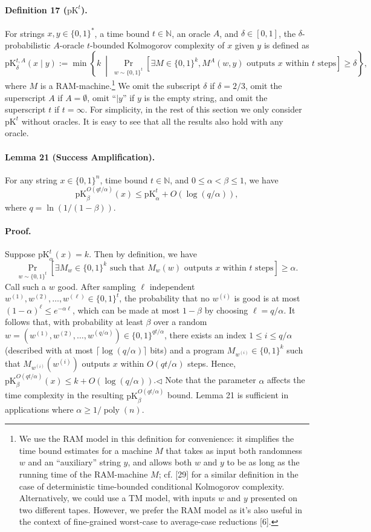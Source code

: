 \paragraph{Definition 17 ($\mathrm{pK}^t$).} For strings $x,y\in\{0,1\}^*$, a time bound $t\in\mathbb N$, an oracle $A$, and $\delta\in[0,1]$, the $\delta$-probabilistic $A$-oracle $t$-bounded Kolmogorov complexity of $x$ given $y$ is defined as
\[\mathrm{pK}_\delta^{t,A}(x\mid y):=\min\left\{k\ \middle|\ \Pr_{w\sim\{0,1\}^t}[\exists M\in\{0,1\}^k,M^A(w,y)\text{ outputs }x\text{ within }t\text{ steps}]\geq\delta\right\},\]
where $M$ is a RAM-machine.\footnote{We use the RAM model in this definition for convenience: it simplifies the time bound estimates for a machine $M$ that takes as input both randomness $w$ and an ``auxiliary'' string $y$, and allows both $w$ and $y$ to be as long as the running time of the RAM-machine $M$; cf. [29] for a similar definition in the case of deterministic time-bounded conditional Kolmogorov complexity. Alternatively, we could use a TM model, with inputs $w$ and $y$ presented on two different tapes. However, we prefer the RAM model as it's also useful in the context of fine-grained worst-case to average-case reductions [6].} We omit the subscript $\delta$ if $\delta=2/3$, omit the superscript $A$ if $A=\emptyset$, omit ``$\mid y$'' if $y$ is the empty string, and omit the superscript $t$ if $t=\infty$.
For simplicity, in the rest of this section we only consider $\mathrm{pK}^t$ without oracles. It is easy to see that all the results also hold with any oracle.
\paragraph{Lemma 21 (Success Amplification).} For any string $x\in\{0,1\}^n$, time bound $t\in\mathbb N$, and $0\leq\alpha<\beta\leq1$, we have
\[\mathrm{pK}_\beta^{O(qt/\alpha)}(x)\leq\mathrm{pK}_\alpha^t+O(\log(q/\alpha)),\]
where $q=\ln(1/(1-\beta))$.
\paragraph{Proof.} Suppose $\mathrm{pK}_\alpha^t(x)=k$. Then by definition, we have
\[\Pr_{w\sim\{0,1\}^t}[\exists M_w\in\{0,1\}^k\text{ such that }M_w(w)\text{ outputs }x\text{ within }t\text{ steps}]\geq\alpha.\]
Call such a $w$ good. After sampling $\ell$ independent $w^{(1)},w^{(2)},\ldots,w^{(\ell)}\in\{0,1\}^t$, the probability that no $w^{(i)}$ is good is at most $(1-\alpha)^\ell\leq e^{-\alpha\ell}$, which can be made at most $1-\beta$ by choosing $\ell=q/\alpha$. It follows that, with probability at least $\beta$ over a random $w=(w^{(1)},w^{(2)},\ldots,w^{(q/\alpha)})\in\{0,1\}^{qt/\alpha}$, there exists an index $1\leq i\leq q/\alpha$ (described with at most $\lceil\log(q/\alpha)\rceil$ bits) and a program $M_{w^{(i)}}\in\{0,1\}^k$ such that $M_{w^{(i)}}(w^{(i)})$ outputs $x$ within $O(qt/\alpha)$ steps. Hence, $\mathrm{pK}_\beta^{O(qt/\alpha)}(x)\leq k+O(\log(q/\alpha))$.\hfill$\triangleleft$
Note that the parameter $\alpha$ affects the time complexity in the resulting $\mathrm{pK}_\beta^{O(qt/\alpha)}$ bound. Lemma 21 is sufficient in applications where $\alpha\geq1/\operatorname{poly}(n)$.
